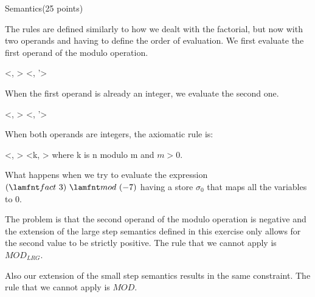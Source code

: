 \documentclass{article}
\begin{document}
\begin{question}{Semantics}{(25 points)}
\begin{subquestion}
   The rules are defined similarly to how we dealt with the factorial, but now with two operands and having to define the order of evaluation. We first evaluate the first operand of the modulo operation.

           {
             <, \sigma> \stepsone <, \sigma'>
           }
           {
           }


   When the first operand is already an integer, we evaluate the second one.

           {
             <, \sigma> \stepsone <, \sigma'>
           }
           {
           }


   When both operands are integers, the axiomatic rule is:

   \infrule[MOD]
           {
           }
           {
             <, \sigma> \stepsone <k, \sigma>
           }
           {
             where k is n modulo m and $m > 0$.
           }
\end{subquestion}

\begin{subquestion}
What happens when we try to evaluate the expression $\modulo{(\fact{3})}{(-7)}$ having a store $\sigma_0$ that maps all the variables to 0.

The problem is that the second operand of the modulo operation is negative and the extension of the large step semantics defined in this exercise only allows for the second value to be strictly positive. The rule that we cannot apply is $MOD_{LRG}$.

Also our extension of the small step semantics results in the same constraint. The rule that we cannot apply is $MOD$.





                     

\end{subquestion}
\end{question}
\end{document}
